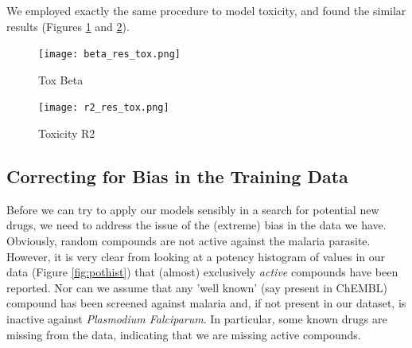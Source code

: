 \documentclass{article}
\begin{document}
We  employed exactly the same procedure to model toxicity, and found the similar results (Figures \ref{fig:toxbeta} and \ref{fig:toxr2}).


\begin{figure}[h!]
\centering
\texttt{[image: beta\_res\_tox.png]}
\caption{Tox Beta}
\label{fig:toxbeta}
\end{figure}

\begin{figure}[h!]
\centering
\texttt{[image: r2\_res\_tox.png]}
\caption{Toxicity R2}
\label{fig:toxr2}
\end{figure}


\subsection{Correcting for Bias in the Training Data}

Before we can try to apply our models sensibly in a search for potential new drugs, we need to address the issue of the (extreme) bias in the data we have.  Obviously, random compounds are not active against the malaria parasite.  However, it is very clear from looking at a potency histogram of values in our data (Figure \ref{fig:pothist}) that (almost) exclusively \textit{active} compounds have been reported.  Nor can we assume that any 'well known' (say present in ChEMBL) compound has been screened against malaria and, if not present in our dataset, is inactive against \textit{Plasmodium Falciparum}.  In particular, some known drugs are missing from the data, indicating that we are missing active compounds.
\end{document}
